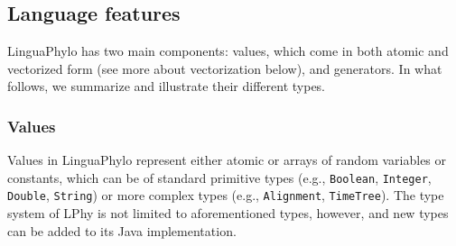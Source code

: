 \documentclass[10pt,letterpaper,table]{article}
\begin{document}

\subsection*{Language features}

LinguaPhylo has two main components: values, which come in both atomic
and vectorized form (see more about vectorization below), and
generators.
In what follows, we summarize and illustrate their different types.

\subsubsection*{Values}

Values in LinguaPhylo represent either atomic or arrays of random
variables or constants, which can be of standard
primitive types (e.g., \texttt{Boolean}, \texttt{Integer},
\texttt{Double}, \texttt{String}) or more complex types (e.g.,
\texttt{Alignment}, \texttt{TimeTree}).
The type system of LPhy is not limited to aforementioned types,
however, and new types can be added to its Java implementation.\newline 

\end{document}
